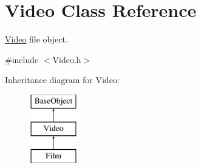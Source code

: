 \hypertarget{classVideo}{\section{Video Class Reference}
\label{classVideo}
}


\hyperlink{classVideo}{Video} file object.  




{\ttfamily \#include $<$Video.\-h$>$}

Inheritance diagram for Video\-:\begin{figure}[H]
\begin{center}
\leavevmode
\includegraphics[height=3.000000cm]{classVideo}
\end{center}
\end{figure}
